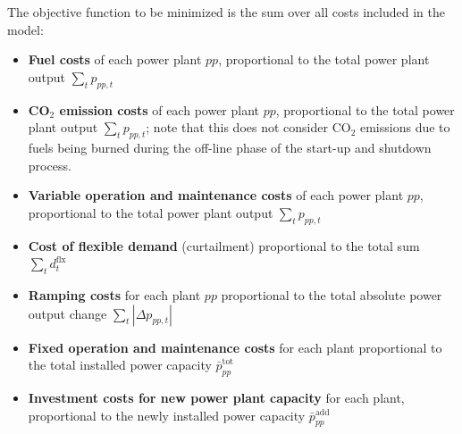 \documentclass[]{article}
\begin{document}
The objective function to be minimized is the sum over all costs
included in the model:

\begin{itemize}
\itemsep1pt\parskip0pt
\item
  \textbf{Fuel costs} of each power plant $pp$, proportional to the
  total power plant output $\sum_t p_{pp,t}$
\item
  \textbf{CO${}_2$ emission costs} of each power plant $pp$,
  proportional to the total power plant output $\sum_t p_{pp,t}$; note
  that this does not consider CO${}_2$ emissions due to fuels being
  burned during the off-line phase of the start-up and shutdown process.
\item
  \textbf{Variable operation and maintenance costs} of each power plant
  $pp$, proportional to the total power plant output $\sum_t p_{pp,t}$
\item
  \textbf{Cost of flexible demand} (curtailment) proportional to the
  total sum $\sum_t d^\mathrm{flx}_t$
\item
  \textbf{Ramping costs} for each plant $pp$ proportional to the total
  absolute power output change $\sum_t \left|\Delta p_{pp,t}\right|$
\item
  \textbf{Fixed operation and maintenance costs} for each plant
  proportional to the total installed power capacity
  $\bar p_{pp}^\mathrm{tot}$
\item
  \textbf{Investment costs for new power plant capacity} for each plant,
  proportional to the newly installed power capacity
  $\bar p_{pp}^\mathrm{add}$
\end{itemize}


%
\end{document}
